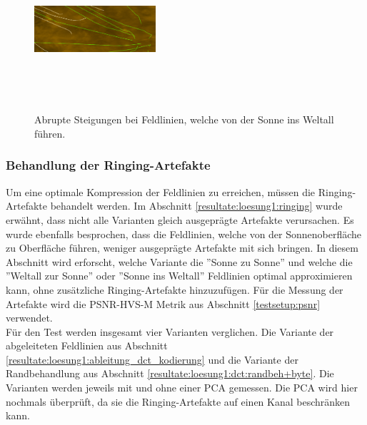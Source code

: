 \begin{figure}[!htbp]
\center
\includegraphics[width=0.4\textwidth,height=6cm,keepaspectratio]{./pictures/resultate/loesung1/ringing/haar-like.png}
	\caption{Abrupte Steigungen bei Feldlinien, welche von der Sonne ins Weltall führen.}
	\label{resultate:loesung1:dct:randbehandlung:harte_richtungswechsel}
\end{figure}

\subsubsection{Behandlung der Ringing-Artefakte} \label{resultate:loesung1:behandlung_ringing}
Um eine optimale Kompression der Feldlinien zu erreichen, müssen die Ringing-Artefakte behandelt werden. Im Abschnitt \ref{resultate:loesung1:ringing} wurde erwähnt, dass nicht alle Varianten gleich ausgeprägte Artefakte verursachen. Es wurde ebenfalls besprochen, dass die Feldlinien, welche von der Sonnenoberfläche zu Oberfläche führen, weniger ausgeprägte Artefakte mit sich bringen. In diesem Abschnitt wird erforscht, welche Variante die ''Sonne zu Sonne'' und welche die ''Weltall zur Sonne'' oder ''Sonne ins Weltall'' Feldlinien optimal approximieren kann, ohne zusätzliche Ringing-Artefakte hinzuzufügen. Für die Messung der Artefakte wird die PSNR-HVS-M Metrik aus Abschnitt \ref{testsetup:psnr} verwendet.\\
Für den Test werden insgesamt vier Varianten verglichen. Die Variante der abgeleiteten Feldlinien aus Abschnitt \ref{resultate:loesung1:ableitung_dct_kodierung} und die Variante der Randbehandlung aus Abschnitt \ref{resultate:loesung1:dct:randbeh+byte}. Die Varianten werden jeweils mit und ohne einer PCA gemessen. Die PCA wird hier nochmals überprüft, da sie die Ringing-Artefakte auf einen Kanal beschränken kann.

